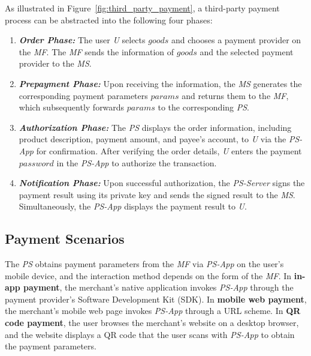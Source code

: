 As illustrated in Figure~\ref{fig:third_party_payment}, a third-party payment process can be abstracted into the following four phases:
\begin{enumerate}[leftmargin=*]
  \item[\rom{1}.] \textit{\textbf{Order Phase:}}
    The user \emph{U} selects $goods$ and chooses a payment provider on the \emph{MF}. 
    The \emph{MF} sends the information of $goods$ and the selected payment provider to the \emph{MS}.
  \item[\rom{2}.] \textit{\textbf{Prepayment Phase:}} 
    Upon receiving the information, the \emph{MS} generates the corresponding payment parameters $params$ and returns them to the \emph{MF},
    which subsequently forwards $params$ to the corresponding \emph{PS}.
  \item[\rom{3}.] \textbf{\textit{Authorization Phase:}} 
    The \emph{PS} displays the order information, including product description, payment amount, and payee's account, to \emph{U} via the \emph{PS-App} for confirmation. 
    After verifying the order details, \emph{U} enters the payment $password$ in the \emph{PS-App} to authorize the transaction.
  \item[\rom{4}.] \textit{\textbf{Notification Phase:}}  
    Upon successful authorization, the \emph{PS-Server} signs the payment result using its private key and sends the signed result to the \emph{MS}.
    Simultaneously, the \emph{PS-App} displays the payment result to \emph{U}.
\end{enumerate}
    
\subsection{Payment Scenarios} \label{sec:payment-scenarios}

The \emph{PS} obtains payment parameters from the \emph{MF} via \emph{PS-App} on the user's mobile device, and the interaction method depends on the form of the \emph{MF}.
In \textbf{in-app payment}, the merchant's native application invokes \emph{PS-App} through the payment provider's Software Development Kit (SDK).
In \textbf{mobile web payment}, the merchant's mobile web page invokes \emph{PS-App} through a URL scheme.
In \textbf{QR code payment}, the user browses the merchant's website on a desktop browser, and the website displays a QR code that the user scans with \emph{PS-App} to obtain the payment parameters.
 
